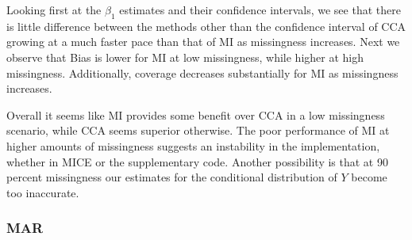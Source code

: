 \documentclass{article}
\begin{document}
	Looking first at the $\beta_{1}$ estimates and their confidence intervals, we see that there is little difference between the methods other than the confidence interval of CCA growing at a much faster pace than that of MI as missingness increases. Next we observe that Bias is lower for MI at low missingness, while higher at high missingness. Additionally, coverage decreases substantially for MI as missingness increases.
	
	Overall it seems like MI provides some benefit over CCA in a low missingness scenario, while CCA seems superior otherwise. The poor performance of MI at higher amounts of missingness suggests an instability in the implementation, whether in MICE or the supplementary code. Another possibility is that at 90 percent missingness our estimates for the conditional distribution of $Y$ become too inaccurate.
	
	\subsubsection{MAR}
\end{document}
